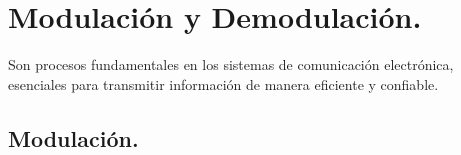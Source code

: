 \section*{\fontsize{12}{18}\selectfont Modulación y Demodulación.}

\begin{justify}
    Son procesos fundamentales en los sistemas de comunicación electrónica, esenciales para transmitir información de manera eficiente y confiable.
\end{justify}

\subsection*{\fontsize{12}{18}\selectfont Modulación.}

